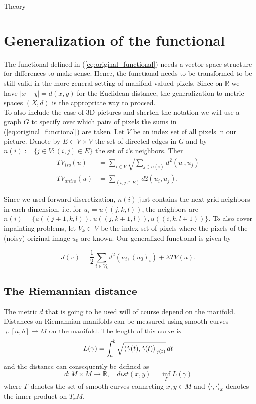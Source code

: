 \begin{chapter}{Theory}
\label{ch:theory}

\section{Generalization of the functional} %
\label{sec:Generalization of the functional}
The functional defined in (\ref{eq:original_functional}) needs a vector space structure for differences to make sense. Hence, the functional
needs to be transformed to be still valid in the more general setting of manifold-valued pixels. Since on $\mathbb{R}$ we have $|x-y|=d(x,y)$ for the 
Euclidean distance, the generalization to metric spaces $(X,d)$ is the appropriate way to proceed.\\

To also include the case of 3D pictures and shorten the notation we will use a graph $G$ to specify over which pairs of pixels the sums in (\ref{eq:original_functional})
are taken. Let $V$ be an index set of all pixels in our picture. Denote by $E\subset V\times V$ the set of directed edges in $G$ and by 
$n(i):=\lbrace j\in V: (i,j)\in E\rbrace$ the set of $i$'s neighbors. Then
\begin{align}
    TV_{iso}(u) &= \sum_{i\in V}\sqrt{\sum_{j\in n(i)}d^{2}(u_i,u_j)}\\
    TV_{aniso}(u) &= \sum_{(i,j\in E)}d{2}(u_i,u_j).
\end{align}

Since we used forward discretization, $n(i)$ just contains the next grid neighbors in each dimension, i.e. for $u_i=u((j,k,l))$, the neighbors are 
$n(i)=\lbrace u((j+1,k,l)), u((j,k+1,l)), u((i,k,l+1)) \rbrace$. To also cover inpainting problems, let $V_k\subset V$ be the index set of pixels
where the pixels of the (noisy) original image $u_0$ are known. Our generalized functional is given by

\begin{equation}
    \label{eq:general_functional}
    J(u)=\frac{1}{2}\sum_{i\in V_k}d^2(u_i,(u_0)_i) +\lambda TV(u).
\end{equation}


\subsection{The Riemannian distance} %
\label{sub:RiemannianDistance}
The metric $d$ that is going to be used will of course depend on the manifold. Distances on Riemannian manifolds can be measured using smooth curves
$\gamma: [a,b]\to M$ on the manifold. The length of this curve is
\begin{equation}
    L(\gamma) =\int_{a}^b\sqrt{\left\langle \dot{\gamma}(t),\dot{\gamma}(t) \right\rangle_{\gamma(t)}}\mathop{dt}
\end{equation}
and the distance can consequently be defined as
\begin{equation}
    d: M\times M\to \mathbb{R},\quad dist(x,y)=\operatorname{inf}_{\Gamma}L(\gamma)
\end{equation}
where $\Gamma$ denotes the set of smooth curves connecting $x,y\in M$ and $\left\langle \cdot,\cdot \right\rangle_x$ denotes the inner product on $T_xM$.\\


\end{chapter}
